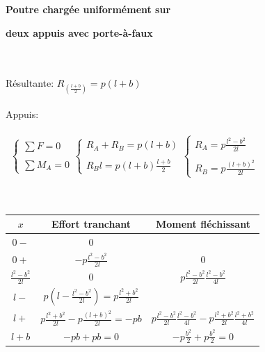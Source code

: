 \documentclass[a4paper]{article}
\begin{document}
\begin{minipage}{9.5cm}
\centerline{\textbf{Poutre chargée uniformément sur}}
\centerline{\textbf{deux appuis avec porte-à-faux}}
~\\
~\\
Résultante: $R_{(\frac{l + b}{2})} = p(l + b)$\\
~\\
Appuis:\\
~\\
~$
\begin{cases}
\sum{F} = 0\\
~\\
\sum{M_A} = 0
\end{cases}
\begin{cases}
R_A + R_B = p(l + b)\\
~\\
R_Bl = p(l + b)\frac{l + b}{2}
\end{cases}
\begin{cases}
R_A = p\frac{l^2 - b^2}{2l}\\
~\\
R_B = p\frac{(l + b)^2}{2l}
\end{cases}
$\\
~\\
~\\
\small
\begin{tabular}{|c|c|c|}\hline
$x$&
Effort tranchant&
Moment fléchissant\\
\hline
$0-$&
$0$&
\\
\hline
$0+$&
$-p\frac{l^2 - b^2}{2l}$&
$0$\\
\hline
$\frac{l^2 - b^2}{2l}$&
$0$&
$p\frac{l^2 - b^2}{2l}\frac{l^2 - b^2}{4l}$\\
\hline
$l-$&
$p(l - \frac{l^2 - b^2}{2l}) = p\frac{l^2 + b^2}{2l}$&
\\
\hline
$l+$&
$p\frac{l^2 + b^2}{2l} - p\frac{(l + b)^2}{2l} = -pb$&
$p\frac{l^2 - b^2}{2l}\frac{l^2 - b^2}{4l} -
 p\frac{l^2 + b^2}{2l}\frac{l^2 + b^2}{4l}$\\
\hline
$l + b$&
$-pb + pb = 0$&
$-p\frac{b^2}{2} + p\frac{b^2}{2} = 0$\\
\hline
\end{tabular}
\normalsize
\end{minipage}
\end{document}
